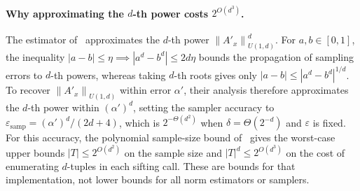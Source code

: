 \documentclass[11pt]{article}
\theoremstyle{definition}
\newcommand{\norm}[1]{\left\lVert #1 \right\rVert}
\newcommand{\abs}[1]{\left\lvert #1 \right\rvert}
\begin{document}
\paragraph{Why approximating the $d$-th power costs $2^{O(d^3)}$.}
The estimator of~\cite[Lemmas~4.3--4.6]{AFKLM24} approximates the $d$-th power $\norm{A'_x}_{U(1, d)}^d$. For $a, b \in [0, 1]$, the inequality $\abs{a - b} \le \eta \implies \abs{a^d - b^d} \le 2d\eta$ bounds the propagation of sampling errors to $d$-th powers, whereas taking $d$-th roots gives only $\abs{a - b} \le \abs{a^d - b^d}^{1/d}$. To recover $\norm{A'_x}_{U(1, d)}$ within error $\alpha'$, their analysis therefore approximates the $d$-th power within $(\alpha')^d$, setting the sampler accuracy to $\varepsilon_{\text{samp}} = (\alpha')^d / (2d+4)$, which is $2^{-\Theta(d^2)}$ when $\delta = \Theta(2^{-d})$ and $\varepsilon$ is fixed. For this accuracy, the polynomial sample-size bound of~\cite[Lemma~4.4]{AFKLM24} gives the worst-case upper bounds $\abs{T} \le 2^{O(d^2)}$ on the sample size and $\abs{T}^d \le 2^{O(d^3)}$ on the cost of enumerating $d$-tuples in each sifting call. These are bounds for that implementation, not lower bounds for all norm estimators or samplers.
\end{document}
